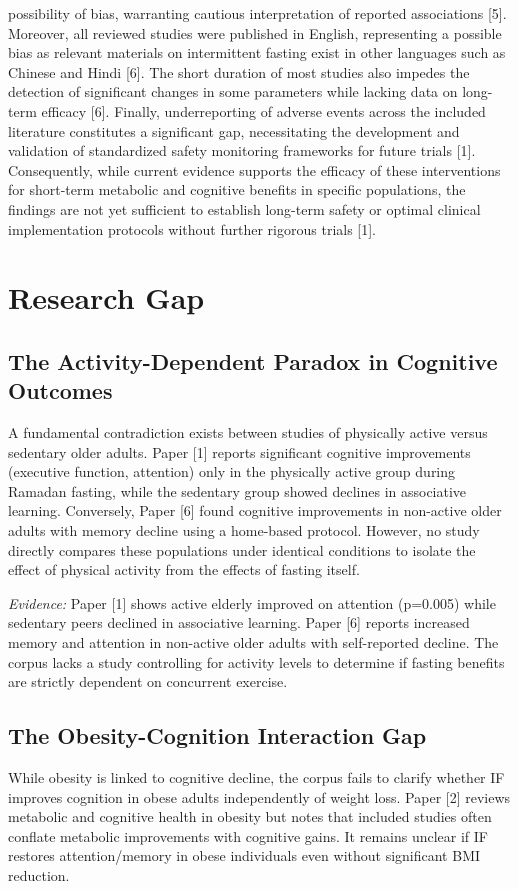 \documentclass[conference]{IEEEtran}
\begin{document}
possibility of bias, warranting cautious interpretation of reported associations [5]. Moreover, all reviewed studies were published in English, representing a possible bias as relevant materials on intermittent fasting exist in other languages such as Chinese and Hindi [6]. The short duration of most studies also impedes the detection of significant changes in some parameters while lacking data on long-term efficacy [6]. Finally, underreporting of adverse events across the included literature constitutes a significant gap, necessitating the development and validation of standardized safety monitoring frameworks for future trials [1]. Consequently, while current evidence supports the efficacy of these interventions for short-term metabolic and cognitive benefits in specific populations, the findings are not yet sufficient to establish long-term safety or optimal clinical implementation protocols without further rigorous trials [1].

\section{Research Gap}
\subsection{The Activity-Dependent Paradox in Cognitive Outcomes}
A fundamental contradiction exists between studies of physically active versus sedentary older adults. Paper [1] reports significant cognitive improvements (executive function, attention) only in the physically active group during Ramadan fasting, while the sedentary group showed declines in associative learning. Conversely, Paper [6] found cognitive improvements in non-active older adults with memory decline using a home-based protocol. However, no study directly compares these populations under identical conditions to isolate the effect of physical activity from the effects of fasting itself.

\textit{Evidence:} Paper [1] shows active elderly improved on attention (p=0.005) while sedentary peers declined in associative learning. Paper [6] reports increased memory and attention in non-active older adults with self-reported decline. The corpus lacks a study controlling for activity levels to determine if fasting benefits are strictly dependent on concurrent exercise.

\subsection{The Obesity-Cognition Interaction Gap}
While obesity is linked to cognitive decline, the corpus fails to clarify whether IF improves cognition in obese adults independently of weight loss. Paper [2] reviews metabolic and cognitive health in obesity but notes that included studies often conflate metabolic improvements with cognitive gains. It remains unclear if IF restores attention/memory in obese individuals even without significant BMI reduction.
\end{document}
